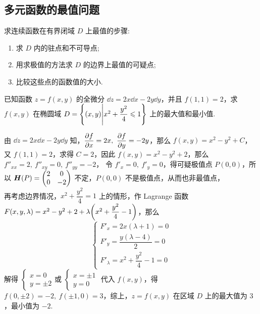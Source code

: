 \subsection{多元函数的最值问题}

求连续函数在有界闭域 $D$ 上最值的步骤:
\begin{enumerate}[label=(\arabic{*})]
    \item 求 $D$ 内的驻点和不可导点;
    \item 用求极值的方法求 $D$ 的边界上最值的可疑点;
    \item 比较这些点的函数值的大小.
\end{enumerate}

\begin{example}[2005 数二]
    已知函数 $z=f(x,y)$ 的全微分 $\dd z=2x\dd x-2y\dd y$，并且 $f(1,1)=2$，求 $f(x,y)$ 在椭圆域 $D=\qty{(x,y)\Bigg| x^2+\dfrac{y^2}{4}\leqslant  1 }$ 上的最大值和最小值.
\end{example}
\begin{solution}
    由 $\dd z=2x\dd x-2y\dd y$ 知，$\displaystyle\pdv{f}{x}=2x,~\pdv{f}{y}=-2y$，那么 $f(x,y)=x^2-y^2+C$，又 $f(1,1)=2$，求得 $C=2$，因此 $f(x,y)=x^2-y^2+2$，那么 $f''_{xx}=2,~f''_{xy}=0,~f''_{yy}=-2$，
    令 $f'_x=0,~f'_y=0$，得可疑极值点 $P(0,0)$，所以 $\vb*{H}(P)=\mqty(2&0\\0&-2)$ 不定，$P(0,0)$ 不是极值点，从而也非最值点，\\ 
    再考虑边界情况，$x^2+\dfrac{y^2}{4}=1$ 上的情形，作 Lagrange 函数 $F(x,y,\lambda)=x^2-y^2+2+\lambda\qty(x^2+\dfrac{y^2}{4}-1)$，那么 
    $$\begin{cases}
        F'_x=2 x (\lambda + 1)=0\\ 
        F'_y=\dfrac{y (\lambda - 4)}{2}=0\\ 
        F'_\lambda=x^2+\dfrac{y^2}{4}-1=0
    \end{cases}$$ 解得 $\begin{cases}
        x=0\\ y=\pm2
    \end{cases}\text{或 }\begin{cases}
        x=\pm 1\\ y=0
    \end{cases}$ 代入 $f(x,y)$，得 $f(0,\pm 2)=-2,~f(\pm1,0)=3$，综上，$z=f(x,y)$ 在区域 $D$ 上的最大值为 $3$，最小值为 $-2$.
\end{solution}